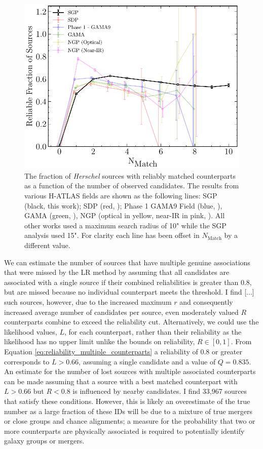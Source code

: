 \begin{figure}
    \centering
    \includegraphics[width=\columnwidth]{Figures/multiplicity.pdf}
    \caption{The fraction of \textit{Herschel} sources with reliably matched counterparts as a function of the number of observed candidates. The results from various H-ATLAS fields are shown as the following lines: SGP (black, this work); SDP (red, \citealt{Smith_2011}); Phase 1 GAMA9 Field (blue, \citealt{Fleuren_2012}), GAMA (green, \citealt{Bourne_2016}), NGP (optical in yellow, near-IR in pink, \citealt{Furlanetto_2018}). All other works used a maximum search radius of 10" while the SGP analysis used 15". For clarity each line has been offset in $N_{\textrm{Match}}$ by a different value.}
    \label{fig:multiplicity}
\end{figure}

We can estimate the number of sources that have multiple genuine associations that were missed by the LR method by assuming that all candidates are associated with a single source if their combined reliabilities is greater than 0.8, but are missed because no individual counterpart meets the threshold. I find [...] such sources, however, due to the increased maximum $r$ and consequently increased average number of candidates per source, even moderately valued $R$ counterparts combine to exceed the reliability cut. Alternatively, we could use the likelihood values, $L$, for each counterpart, rather than their reliability as the likelihood has no upper limit unlike the bounds on reliability, $R \in [0, 1]$. From Equation \ref{eq:reliability_multiple_counterparts} a reliability of 0.8 or greater corresponds to $L > 0.66$, assuming a single candidate and a value of $Q = 0.835$. An estimate for the number of lost sources with multiple associated counterparts can be made assuming that a source with a best matched counterpart with $L > 0.66$ but $R < 0.8$ is influenced by nearby candidates. I find 33,967 sources that satisfy these conditions. However, this is likely an overestimate of the true number as a large fraction of these IDs will be due to a mixture of true mergers or close groups and chance alignments; a measure for the probability that two or more counterparts are physically associated is required to potentially identify galaxy groups or mergers.

